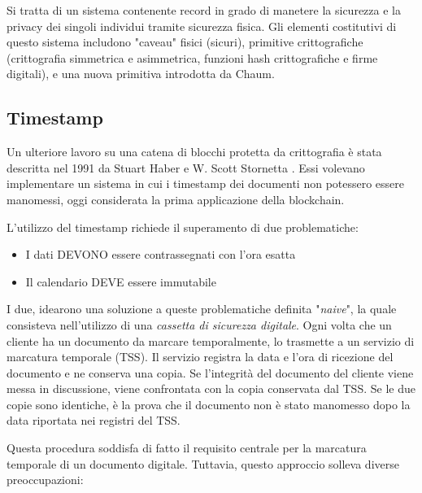 Si tratta di un sistema contenente record in grado di manetere la sicurezza e la privacy dei singoli individui tramite sicurezza fisica. Gli elementi costitutivi di questo sistema includono "caveau" fisici (sicuri), primitive crittografiche (crittografia simmetrica e asimmetrica, funzioni hash crittografiche e firme digitali), e una nuova primitiva introdotta da Chaum.

\subsection{Timestamp}
Un ulteriore lavoro su una catena di blocchi protetta da crittografia è stata descritta nel 1991 da Stuart Haber e W. Scott Stornetta \cite{haber1990time}. Essi volevano implementare un sistema in cui i timestamp dei documenti non potessero essere manomessi, oggi considerata la prima applicazione della blockchain.

L'utilizzo del timestamp richiede il superamento di due problematiche:
\begin{itemize}
  \item I dati DEVONO essere contrassegnati con l'ora esatta
  \item Il calendario DEVE essere immutabile
\end{itemize}

I due, idearono una soluzione a queste problematiche definita "\textit{naive}", la quale consisteva nell'utilizzo di una \textit{cassetta di sicurezza digitale}. Ogni volta che un cliente ha un documento da marcare temporalmente, lo trasmette a un servizio di marcatura temporale (TSS). Il servizio registra la data e l'ora di ricezione del documento e ne conserva una copia. Se l'integrità del documento del cliente viene messa in discussione, viene confrontata con la copia conservata dal TSS. Se le due copie sono identiche, è la prova che il documento non è stato manomesso dopo la data riportata nei registri del TSS.

Questa procedura soddisfa di fatto il requisito centrale per la marcatura temporale di un documento digitale. Tuttavia, questo approccio solleva diverse preoccupazioni:

